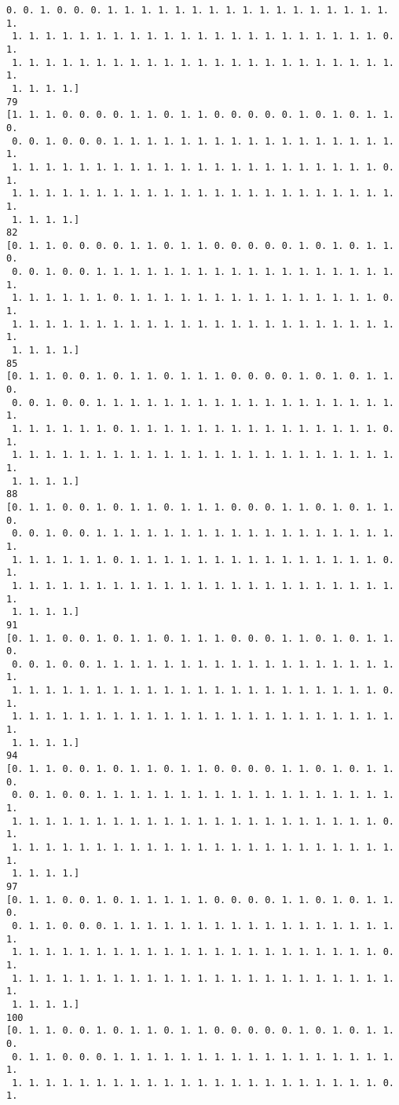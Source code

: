 \documentclass[11pt]{article}
\begin{document}
\begin{Verbatim}[commandchars=\\\{\}]
 0. 0. 1. 0. 0. 0. 1. 1. 1. 1. 1. 1. 1. 1. 1. 1. 1. 1. 1. 1. 1. 1. 1. 1.
 1. 1. 1. 1. 1. 1. 1. 1. 1. 1. 1. 1. 1. 1. 1. 1. 1. 1. 1. 1. 1. 1. 0. 1.
 1. 1. 1. 1. 1. 1. 1. 1. 1. 1. 1. 1. 1. 1. 1. 1. 1. 1. 1. 1. 1. 1. 1. 1.
 1. 1. 1. 1.]
79
[1. 1. 1. 0. 0. 0. 0. 1. 1. 0. 1. 1. 0. 0. 0. 0. 0. 1. 0. 1. 0. 1. 1. 0.
 0. 0. 1. 0. 0. 0. 1. 1. 1. 1. 1. 1. 1. 1. 1. 1. 1. 1. 1. 1. 1. 1. 1. 1.
 1. 1. 1. 1. 1. 1. 1. 1. 1. 1. 1. 1. 1. 1. 1. 1. 1. 1. 1. 1. 1. 1. 0. 1.
 1. 1. 1. 1. 1. 1. 1. 1. 1. 1. 1. 1. 1. 1. 1. 1. 1. 1. 1. 1. 1. 1. 1. 1.
 1. 1. 1. 1.]
82
[0. 1. 1. 0. 0. 0. 0. 1. 1. 0. 1. 1. 0. 0. 0. 0. 0. 1. 0. 1. 0. 1. 1. 0.
 0. 0. 1. 0. 0. 1. 1. 1. 1. 1. 1. 1. 1. 1. 1. 1. 1. 1. 1. 1. 1. 1. 1. 1.
 1. 1. 1. 1. 1. 1. 0. 1. 1. 1. 1. 1. 1. 1. 1. 1. 1. 1. 1. 1. 1. 1. 0. 1.
 1. 1. 1. 1. 1. 1. 1. 1. 1. 1. 1. 1. 1. 1. 1. 1. 1. 1. 1. 1. 1. 1. 1. 1.
 1. 1. 1. 1.]
85
[0. 1. 1. 0. 0. 1. 0. 1. 1. 0. 1. 1. 1. 0. 0. 0. 0. 1. 0. 1. 0. 1. 1. 0.
 0. 0. 1. 0. 0. 1. 1. 1. 1. 1. 1. 1. 1. 1. 1. 1. 1. 1. 1. 1. 1. 1. 1. 1.
 1. 1. 1. 1. 1. 1. 0. 1. 1. 1. 1. 1. 1. 1. 1. 1. 1. 1. 1. 1. 1. 1. 0. 1.
 1. 1. 1. 1. 1. 1. 1. 1. 1. 1. 1. 1. 1. 1. 1. 1. 1. 1. 1. 1. 1. 1. 1. 1.
 1. 1. 1. 1.]
88
[0. 1. 1. 0. 0. 1. 0. 1. 1. 0. 1. 1. 1. 0. 0. 0. 1. 1. 0. 1. 0. 1. 1. 0.
 0. 0. 1. 0. 0. 1. 1. 1. 1. 1. 1. 1. 1. 1. 1. 1. 1. 1. 1. 1. 1. 1. 1. 1.
 1. 1. 1. 1. 1. 1. 0. 1. 1. 1. 1. 1. 1. 1. 1. 1. 1. 1. 1. 1. 1. 1. 0. 1.
 1. 1. 1. 1. 1. 1. 1. 1. 1. 1. 1. 1. 1. 1. 1. 1. 1. 1. 1. 1. 1. 1. 1. 1.
 1. 1. 1. 1.]
91
[0. 1. 1. 0. 0. 1. 0. 1. 1. 0. 1. 1. 1. 0. 0. 0. 1. 1. 0. 1. 0. 1. 1. 0.
 0. 0. 1. 0. 0. 1. 1. 1. 1. 1. 1. 1. 1. 1. 1. 1. 1. 1. 1. 1. 1. 1. 1. 1.
 1. 1. 1. 1. 1. 1. 1. 1. 1. 1. 1. 1. 1. 1. 1. 1. 1. 1. 1. 1. 1. 1. 0. 1.
 1. 1. 1. 1. 1. 1. 1. 1. 1. 1. 1. 1. 1. 1. 1. 1. 1. 1. 1. 1. 1. 1. 1. 1.
 1. 1. 1. 1.]
94
[0. 1. 1. 0. 0. 1. 0. 1. 1. 0. 1. 1. 0. 0. 0. 0. 1. 1. 0. 1. 0. 1. 1. 0.
 0. 0. 1. 0. 0. 1. 1. 1. 1. 1. 1. 1. 1. 1. 1. 1. 1. 1. 1. 1. 1. 1. 1. 1.
 1. 1. 1. 1. 1. 1. 1. 1. 1. 1. 1. 1. 1. 1. 1. 1. 1. 1. 1. 1. 1. 1. 0. 1.
 1. 1. 1. 1. 1. 1. 1. 1. 1. 1. 1. 1. 1. 1. 1. 1. 1. 1. 1. 1. 1. 1. 1. 1.
 1. 1. 1. 1.]
97
[0. 1. 1. 0. 0. 1. 0. 1. 1. 1. 1. 1. 0. 0. 0. 0. 1. 1. 0. 1. 0. 1. 1. 0.
 0. 1. 1. 0. 0. 0. 1. 1. 1. 1. 1. 1. 1. 1. 1. 1. 1. 1. 1. 1. 1. 1. 1. 1.
 1. 1. 1. 1. 1. 1. 1. 1. 1. 1. 1. 1. 1. 1. 1. 1. 1. 1. 1. 1. 1. 1. 0. 1.
 1. 1. 1. 1. 1. 1. 1. 1. 1. 1. 1. 1. 1. 1. 1. 1. 1. 1. 1. 1. 1. 1. 1. 1.
 1. 1. 1. 1.]
100
[0. 1. 1. 0. 0. 1. 0. 1. 1. 0. 1. 1. 0. 0. 0. 0. 0. 1. 0. 1. 0. 1. 1. 0.
 0. 1. 1. 0. 0. 0. 1. 1. 1. 1. 1. 1. 1. 1. 1. 1. 1. 1. 1. 1. 1. 1. 1. 1.
 1. 1. 1. 1. 1. 1. 1. 1. 1. 1. 1. 1. 1. 1. 1. 1. 1. 1. 1. 1. 1. 1. 0. 1.

\end{Verbatim}
\end{document}
